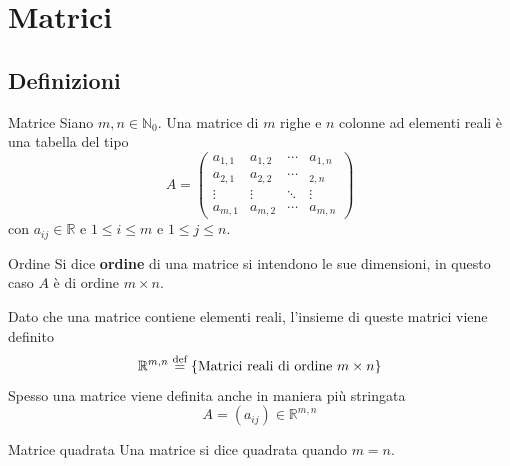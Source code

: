 
\section{Matrici}%
\label{sec:matrici}

\subsection{Definizioni}%
\label{sub:definizioni_e_teoremi}

\begin{Def}{Matrice}
  Siano $m,n\in\mathbb{N}_0$. Una matrice di $m$ righe e $n$ colonne ad elementi reali è
  una tabella del tipo
  \begin{equation*}
    A =
    \begin{pmatrix}
      a_{1,1} & a_{1,2} & \cdots & a_{1,n} \\
      a_{2,1} & a_{2,2} & \cdots & _{2,n} \\
      \vdots  & \vdots  & \ddots & \vdots  \\
      a_{m,1} & a_{m,2} & \cdots & a_{m,n}
    \end{pmatrix}
  \end{equation*}
  con $a_{ij}\in\mathbb{R}$ e $1\leq i\leq m$ e $1\leq j\leq n$.
\end{Def}

\begin{Def}{Ordine}
  Si dice \textbf{ordine} di una matrice si intendono le sue dimensioni, in questo caso
  $A$ è di ordine $m\times n$.
\end{Def}

Dato che una matrice contiene elementi reali, l'insieme di queste matrici viene definito
\begin{equation*}
  \mathbb{R}^{m,n}\overset{\text{def}}{=} \{\text{Matrici reali di ordine }m\times n\}
\end{equation*}
Spesso una matrice viene definita anche in maniera più stringata
\begin{equation*}
  A = (a_{ij})\in\mathbb{R}^{m,n}
\end{equation*}

\begin{Def}{Matrice quadrata}
  Una matrice si dice quadrata quando $m=n$.
\end{Def}

